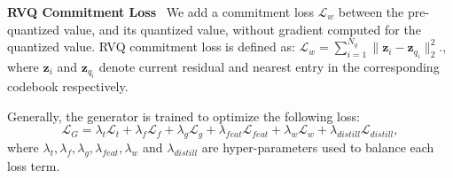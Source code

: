 \textbf{RVQ Commitment Loss}~
We add a commitment loss $\mathcal{L}_w$ between the pre-quantized value, and its quantized value, without gradient computed for the quantized value. RVQ commitment loss is defined as:
$
\mathcal{L}_w=\sum_{i=1}^{N_q}\lVert \mathbf{z}_i - \mathbf{z}_{q_i}\rVert_2^2.
$, where $\mathbf{z}_i$ and $\mathbf{z}_{q_i}$ denote current residual and nearest entry in the corresponding codebook respectively. 

Generally, the generator is trained to optimize the following loss:$$\mathcal{L}_G=\lambda_t\mathcal{L}_t+\lambda_f\mathcal{L}_f+\lambda_g\mathcal{L}_g+\lambda_{feat}\mathcal{L}_{feat}+\lambda_w\mathcal{L}_w+\lambda_{distill}\mathcal{L}_{distill},$$ where $\lambda_t,\lambda_f,\lambda_g,\lambda_{feat},\lambda_{w}$ and $\lambda_{distill}$ are hyper-parameters used to balance each loss term.


